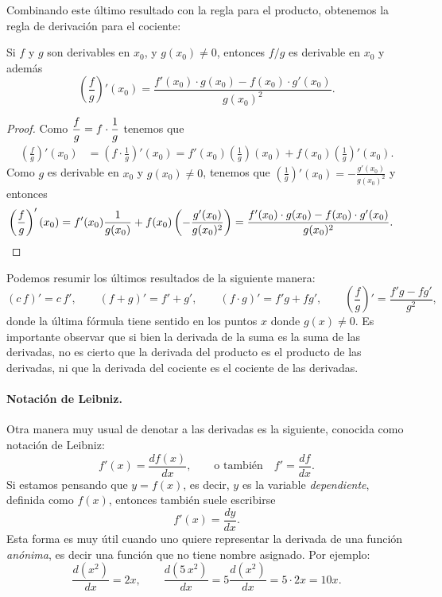 Combinando este último resultado con la regla para el producto, obtenemos la regla de derivación para el cociente:

\begin{corollary}
    Si $f$ y $g$ son derivables en $x_0$, y $g(x_0)\neq 0$, entonces $f/ g$ es derivable en $x_0$ y además
    \[
    \left(\frac f g\right)'(x_0) = \frac{f'(x_0)\cdot g(x_0)-f(x_0)\cdot g'(x_0)}{g(x_0)^2}.
    \]
\end{corollary}

\begin{proof}
Como $\displaystyle\frac fg = f \cdot \frac1g$ tenemos que
    \begin{align*}
        \left(\frac f g\right)'(x_0) 
        &= \left(f \cdot \frac 1 g\right)'(x_0)
        = f'(x_0) \left(\frac 1 g\right)(x_0) + f(x_0) \left(\frac 1 g\right)'(x_0).
    \end{align*}
Como $g$ es derivable en $x_0$ y $g(x_0)\neq 0$, tenemos que $\left(\frac1g\right)'(x_0) = - \frac{g'(x_0)}{g(x_0)^2}$ y entonces
    \begin{align*}
        \left(\frac f g\right)'(x_0) 
        &= f'(x_0) \frac 1 {g(x_0)} + f(x_0) \left(- \frac{g'(x_0)}{g(x_0)^2}\right)
        = \frac{f'(x_0)\cdot g(x_0)-f(x_0)\cdot g'(x_0)}{g(x_0)^2}.
        \qedhere
    \end{align*}
\end{proof}

Podemos resumir los últimos resultados de la siguiente manera:
\[
(c\, f)' = c\, f',
\qquad
(f+g)' = f'+g',
\qquad
(f\cdot g)' = f'g+f g',
\qquad
\left(\frac f g\right)' = \frac{f'g-f g'}{g^2},
\]
donde la última fórmula tiene sentido en los puntos $x$ donde $g(x)\neq 0$.
Es importante observar que si bien la derivada de la suma es la suma de las derivadas, no es cierto que la derivada del producto es el producto de las derivadas, ni que la derivada del cociente es el cociente de las derivadas.

\paragraph{Notación de Leibniz.}
Otra manera muy usual de denotar a las derivadas es la siguiente, conocida como notación de Leibniz:
\[
f'(x)= \frac{df(x)}{dx}, \qquad\text{o también}\quad f'= \frac{df}{dx}.
\]
Si estamos pensando que $y=f(x)$, es decir, $y$ es la variable \emph{dependiente}, definida como $f(x)$, entonces también suele escribirse
\[
f'(x) = \frac{dy}{dx}.
\]
Esta forma es muy útil cuando uno quiere representar la derivada de una función \emph{anónima}, es decir una función que no tiene nombre asignado. Por ejemplo:
\[
\frac{d (x^2)}{dx} = 2x,
\qquad
\frac{d (5 \, x^2)}{dx} = 5 \frac{d (x^2)}{dx} =5\cdot 2x = 10x.
\]

